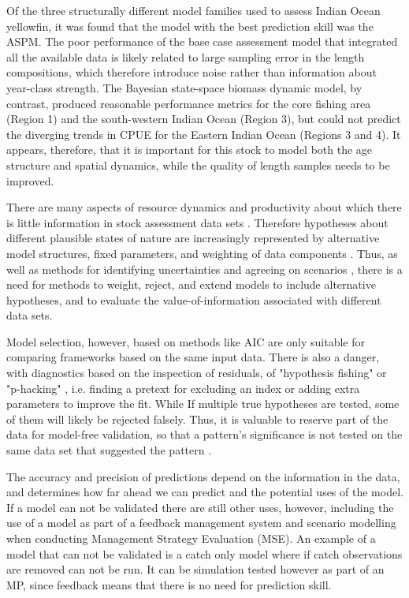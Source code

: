 \documentclass[12pt,halfline,a4paper,nonumbib]{ouparticle}
\begin{document}
Of the three structurally different model families used to assess Indian Ocean yellowfin, it was found that the model with the best prediction skill was the ASPM. The poor performance of the base case assessment model that integrated all the available data is likely related to large sampling error in the length compositions, which therefore introduce noise rather than information about year-class strength. The Bayesian state-space biomass dynamic model, by contrast, produced reasonable performance metrics for the core fishing area (Region 1) and the south-western Indian Ocean (Region 3), but could not predict the diverging trends in CPUE for the Eastern Indian Ocean (Regions 3 and 4). It appears, therefore, that it is important for this stock to model both the age structure and spatial dynamics, while the quality of length samples needs to be improved. 

There are many aspects of resource dynamics and productivity about which there is little information in stock assessment data sets \parencite[e.g.][]{lee2011m,lee2012steepness, jiao2012modelling,simon2012effects,mangel2013perspective,pepin2015reconsidering,cury2014resolving}. Therefore hypotheses about different plausible states of nature are increasingly represented by alternative model structures, fixed parameters, and weighting of data components \parencite[][]{sharma2020trfmo}. Thus, as well as methods for identifying uncertainties and agreeing on scenarios \parencite{leach2014elicit}, there is a need for methods to weight, reject, and extend models to include alternative hypotheses, and to evaluate the value-of-information associated with different data sets. 

Model selection, however, based on methods like AIC are only suitable for comparing frameworks based on the same input data. There is also a danger, with diagnostics based on the inspection of residuals, of "hypothesis fishing" or "p-hacking" \parencite{wasserstein2016asa,head2015extent}, i.e. finding a pretext for excluding an index or adding extra parameters %
to improve the fit. While If multiple true hypotheses are tested, some of them will likely be rejected falsely. Thus, it is valuable to reserve part of the data for model-free validation, so that a pattern’s significance is not tested on the same data set that suggested the pattern \parencite{arlot2010survey}.


The accuracy and precision of predictions depend on the information in the data, and determines how far ahead we can predict and the potential uses of the model. If a model can not be validated there are still other uses, however, including the use of a model as part of a feedback management system and scenario modelling when conducting Management Strategy Evaluation (MSE). An example of a model that can not be validated is a catch only model where if catch observations are removed can not be run. It can be simulation tested however as part of an MP, since feedback means that there is no need for prediction skill.
\end{document}
